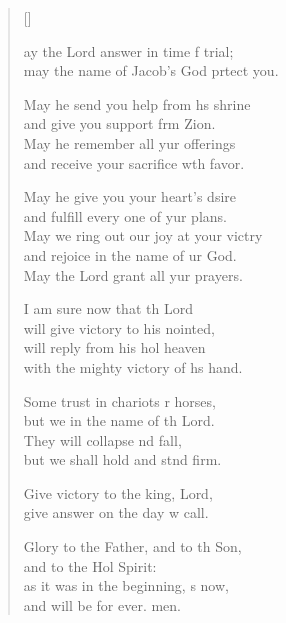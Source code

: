 \settowidth{\versewidth}{May we ring out our joy at your victory +}
\begin{verse}[\versewidth]
  \begin{patverse}
ay the Lord answer in time f trial;\Med\\
may the name of Jacob’s God prtect you.

May he send you help from h\pointup{\i}s shrine\Med\\
and give you support frm Zion.\\
May he remember all yur offerings\Med\\
and receive your sacrifice w\pointup{\i}th favor.

May he give you your heart’s dsire\Med\\
and fulfill every one of yur plans.\\
May we ring out our joy at your victry\Flex\\
and rejoice in the name of ur God.\Med\\
May the Lord grant all yur prayers.

I am sure now that th Lord\Med\\
will give victory to his nointed,\\
will reply from his hol heaven\Med\\
with the mighty victory of h\pointup{\i}s hand.

Some trust in chariots r horses,\Med\\
but we in the name of th Lord.\\
They will collapse nd fall,\Med\\
but we shall hold and stnd firm.

Give victory to the king,  Lord,\Med\\
give answer on the day w call.

Glory to the Father, and to th Son,\Med\\
and to the Hol Spirit:\\
as it was in the beginning, \pointup{\i}s now,\Med\\
and will be for ever. men.
  \end{patverse}
\end{verse}
